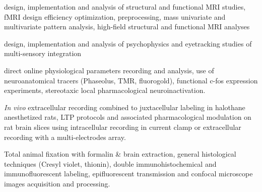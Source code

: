  design, implementation and analysis of structural 
and functional MRI studies, fMRI design efficiency optimization, preprocessing, 
mass univariate and multivariate pattern analysis, 
high-field structural and functional MRI analyses

 design, implementation and analysis of psychophysics 
and eyetracking studies of multi-sensory integration

 direct online physiological parameters recording and analysis, 
use of neuroanatomical tracers (Phaseolus, TMR, fluorogold), functional c-fos expression experiments, 
stereotaxic local pharmacological neuroinactivation.

 \textit{In vivo} extracellular recording combined 
to juxtacellular labeling in halothane anesthetized rats, LTP protocols 
and associated pharmacological modulation on rat brain slices using intracellular recording 
in current clamp or extracellular recording with a multi-electrodes array.

 Total animal fixation with formalin \& brain extraction, 
general histological techniques (Cresyl violet, thionin), double immunohistochemical and 
immunofluorescent labeling, epifluorescent transmission 
and confocal microscope images acquisition and processing.
